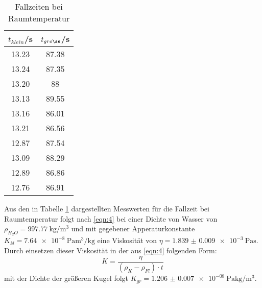 \begin{table}[h]
  \centering
  \caption{Fallzeiten bei Raumtemperatur}
  \label{tab:3}
  \begin{tabular}{c c}
    \toprule
    $t_{klein}$/\si{\second} & $t_{gro\ss}$/\si{\second} \\
    \midrule
    13.23 & 87.38 \\
    13.24 & 87.35 \\
    13.20 & 88 \\
    13.13 & 89.55 \\
    13.16 & 86.01 \\
    13.21 & 86.56 \\
    12.87 & 87.54 \\
    13.09 & 88.29 \\
    12.89 & 86.86 \\
    12.76 & 86.91 \\
    \bottomrule
  \end{tabular}
\end{table}
Aus den in Tabelle \ref{tab:3} dargestellten Messwerten für die Fallzeit bei Raumtemperatur
folgt nach \eqref{eqn:4} bei einer Dichte von Wasser von $\rho_{H_2O} = \SI[per-mode=reciprocal]{997.77}{\kilo\gram\per\cubic\metre}$
und mit gegebener Apperaturkonstante $K_{kl} = \SI[per-mode=reciprocal]{7.64e-8}{\pascal\cubic\metre\per\kilo\gram}$
eine Viskosität von $\eta = \SI{1.839(9)e-3}{\pascal\second}$.
Durch einsetzen dieser Viskosität in der aus \eqref{eqn:4} folgenden Form:
\begin{equation}
  K = \frac{\eta}{(\rho_K - \rho_{Fl}) \cdot t}
\end{equation}
mit der Dichte der größeren Kugel folgt $K_{gr} = \SI[per-mode=reciprocal]{1.206(7)e-08}{\pascal\kilo\gram\per\cubic\metre}$.
